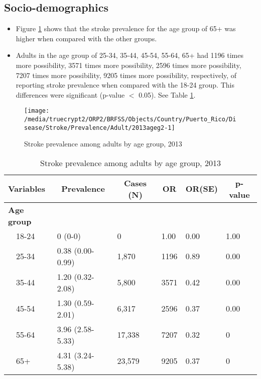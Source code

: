 \newpage
\subsection{Socio-demographics}

\begin{itemize}

\item Figure \ref{fig:age.Stroke.2013} shows that the stroke prevalence for the age group of
65+
was higher when compared with the other groups.

\item Adults in the age group of 25-34, 35-44, 45-54, 55-64, 65+ had 1196 times more possibility, 3571 times more possibility, 2596 times more possibility, 7207 times more possibility, 9205 times more possibility, respectively, of reporting stroke prevalence when compared with the 18-24 group. This differences were significant (p-value $<$ 0.05). See Table \ref{tab:age.Stroke.2013}.


\end{itemize}


\begin{figure}[H]
\caption{Stroke prevalence among adults by age group, 
2013}
\begin{knitrout}
\color{fgcolor}

{\centering \texttt{[image: /media/truecrypt2/ORP2/BRFSS/Objects/Country/Puerto\_Rico/Disease/Stroke/Prevalence/Adult/2013ageg2-1]} 

}



\end{knitrout}
\label{fig:age.Stroke.2013}
\end{figure}

\begin{table}[H]
\caption{Stroke prevalence  among adults by age group, 2013\label{tab:age.Stroke.2013}} 
\begin{center}
\begin{tabular}{llllll}
\hline\hline
\multicolumn{1}{l}{Variables}&\multicolumn{1}{c}{Prevalence}&\multicolumn{1}{c}{Cases (N)}&\multicolumn{1}{c}{OR}&\multicolumn{1}{c}{OR(SE)}&\multicolumn{1}{c}{p-value}\tabularnewline
\hline
{\bfseries Age group}&&&&&\tabularnewline
~~18-24&0 (0-0)&     0&1.00&0.00&1.00\tabularnewline
~~25-34&0.38 (0.00-0.99)& 1,870&1196&0.89&0.00\tabularnewline
~~35-44&1.20 (0.32-2.08)& 5,800&3571&0.42&0.00\tabularnewline
~~45-54&1.30 (0.59-2.01)& 6,317&2596&0.37&0.00\tabularnewline
~~55-64&3.96 (2.58-5.33)&17,338&7207&0.32&0\tabularnewline
~~65+&4.31 (3.24-5.38)&23,579&9205&0.37&0\tabularnewline
\hline
\end{tabular}\end{center}

\end{table}


